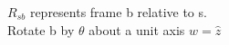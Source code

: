 \documentclass[preview]{standalone}
\begin{document}
\begin{center}
$R_{sb}$ represents frame {b} relative to {s}.\\ Rotate {b} by $\theta$ about a unit axis $\hat{w} = \hat{z}$
\end{center}
\end{document}
